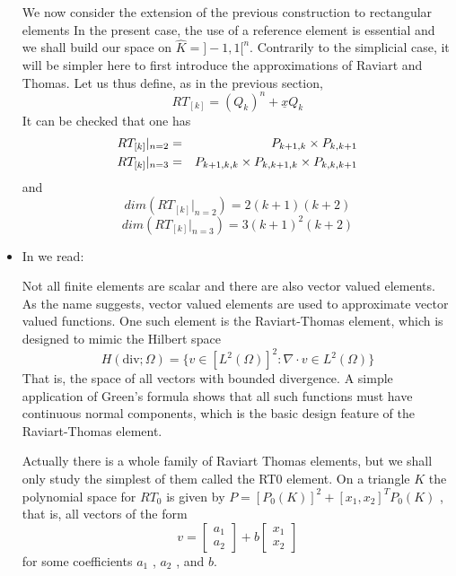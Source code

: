 \begin{itemize}
\begin{displayquote}
{We now consider the extension of the previous construction to rectangular 
elements
In the present case, the use of a reference element is essential and we shall build
our space on $\hat{K}=]-1,1[^n$. Contrarily to the simplicial case, it will be
simpler here to first introduce the approximations of Raviart and Thomas.
Let us thus define, as in the previous section,
\[
RT_{[k]} = (Q_k)^n + \underline{x} Q_k
\]
It can be checked that one has
\begin{eqnarray}
RT_{[k]}|_{n=2} &=& P_{k+1,k} \times P_{k,k+1} \nonumber\\
RT_{[k]}|_{n=3} &=& P_{k+1,k,k} \times P_{k,k+1,k} \times P_{k,k,k+1} \nonumber
\end{eqnarray}
and 
\[
dim(RT_{[k]}|_{n=2}) = 2(k+1)(k+2)
\]
\[
dim(RT_{[k]}|_{n=3}) = 3(k+1)^2(k+2)
\]

}
\end{displayquote}



\item
In \textcite{LarsonBengzon} we read: 
\begin{displayquote}
{\color{darkgray}
Not all finite elements are scalar and there are also vector valued elements. As
the name suggests, vector valued elements are used to approximate vector valued
functions. One such element is the Raviart-Thomas element, which is designed to
mimic the Hilbert space
\[
H(\text{div}; \Omega) = \{ v\in [L^2(\Omega)]^2 : \nabla \cdot v \in L^2(\Omega) \}
\]
That is, the space of all vectors with bounded divergence. A simple application
of Green’s formula shows that all such functions must have continuous normal
components, which is the basic design feature of the Raviart-Thomas element.



Actually there is a whole family of Raviart Thomas elements, but we shall only
study the simplest of them called the RT0 element. On a triangle $K$ the polynomial
space for $RT_0$ is given by $P=[P_0(K)]^2 + [x_1,x_2]^T P_0(K)$
, that is, all vectors of the form 
\[
v = \left[ \begin{array}{c} a_1 \\ a_2 \end{array} \right]
+ b\left[ \begin{array}{c} x_1 \\ x_2 \end{array} \right]
\]
for some coefficients $a_1$ , $a_2$ , and $b$.

}
\end{displayquote}
\end{itemize}
